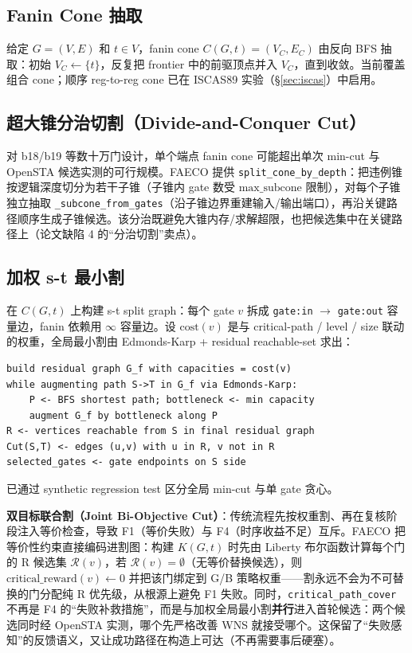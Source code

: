 \documentclass[journal]{IEEEtran}
\begin{document}
\subsection{Fanin Cone 抽取}

给定 $G = (V, E)$ 和 $t \in V$，fanin cone $C(G, t) = (V_C, E_C)$ 由反向 BFS 抽取：初始 $V_C \leftarrow \{t\}$，反复把 frontier 中的前驱顶点并入 $V_C$，直到收敛。当前覆盖组合 cone；顺序 reg-to-reg cone 已在 ISCAS89 实验（\S\ref{sec:iscas}）中启用。

\subsection{超大锥分治切割（Divide-and-Conquer Cut）}

对 b18/b19 等数十万门设计，单个端点 fanin cone 可能超出单次 min-cut 与 OpenSTA 候选实测的可行规模。FAECO 提供 \texttt{split\_cone\_by\_depth}：把违例锥按逻辑深度切分为若干子锥（子锥内 gate 数受 $\mathrm{max\_subcone}$ 限制），对每个子锥独立抽取 \texttt{\_subcone\_from\_gates}（沿子锥边界重建输入/输出端口），再沿关键路径顺序生成子锥候选。该分治既避免大锥内存/求解超限，也把候选集中在关键路径上（论文缺陷 4 的“分治切割”卖点）。

\subsection{加权 s-t 最小割}

在 $C(G, t)$ 上构建 s-t split graph：每个 gate $v$ 拆成 \texttt{gate:in} $\rightarrow$ \texttt{gate:out} 容量边，fanin 依赖用 $\infty$ 容量边。设 $\mathrm{cost}(v)$ 是与 critical-path / level / size 联动的权重，全局最小割由 Edmonds-Karp + residual reachable-set 求出：
\begin{verbatim}
build residual graph G_f with capacities = cost(v)
while augmenting path S->T in G_f via Edmonds-Karp:
    P <- BFS shortest path; bottleneck <- min capacity
    augment G_f by bottleneck along P
R <- vertices reachable from S in final residual graph
Cut(S,T) <- edges (u,v) with u in R, v not in R
selected_gates <- gate endpoints on S side
\end{verbatim}

已通过 synthetic regression test 区分全局 min-cut 与单 gate 贪心。

\textbf{双目标联合割（Joint Bi-Objective Cut）}：传统流程先按权重割、再在复核阶段注入等价检查，导致 F1（等价失败）与 F4（时序收益不足）互斥。FAECO 把等价性约束直接编码进割图：构建 $K(G, t)$ 时先由 Liberty 布尔函数计算每个门的 R 候选集 $\mathcal{R}(v)$，若 $\mathcal{R}(v)=\emptyset$（无等价替换候选），则 $\mathrm{critical\_reward}(v) \leftarrow 0$ 并把该门绑定到 G/B 策略权重——割永远不会为不可替换的门分配纯 R 优先级，从根源上避免 F1 失败。同时，\texttt{critical\_path\_cover} 不再是 F4 的“失败补救措施”，而是与加权全局最小割\textbf{并行}进入首轮候选：两个候选同时经 OpenSTA 实测，哪个先严格改善 WNS 就接受哪个。这保留了“失败感知”的反馈语义，又让成功路径在构造上可达（不再需要事后硬塞）。
\end{document}
